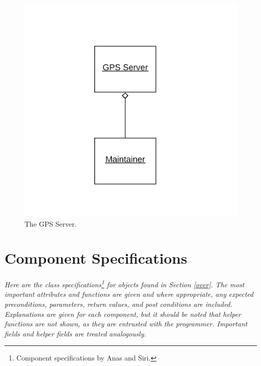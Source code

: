 \documentclass[12pt]{article}
\begin{document}
\begin{figure}[H]
    \centerline{\includegraphics[scale=.20]{GPSServer.png}}
    \caption{The GPS Server.}
    \label{fig:GPSServer}
\end{figure}   

\section{Component Specifications}
\paragraph{} \textit{Here are the class specifications\footnote{Component specifications by Anas and Siri.} for objects 
found in Section \ref{over}. The most important attributes and functions are given and where appropriate, any expected 
preconditions, parameters, return values, and post conditions are included. Explanations are given for each component, but 
it should be noted that helper functions are not shown, as they are entrusted with the programmer. Important fields and helper
fields are treated analogously.}
\end{document}
